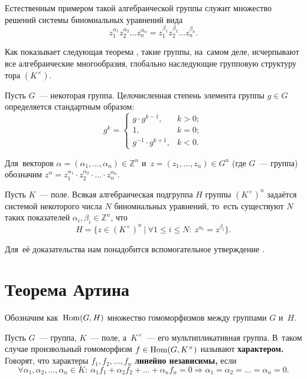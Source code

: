 \documentclass[a4paper,oneside]{article}
\begin{document}
Естественным примером такой алгебраической группы служит множество решений системы биномиальных уравнений вида
$$
    z_1^{\alpha_1} z_2^{\alpha_2} \ldots z_n^{\alpha_n} = z_1^{\beta_1} z_2^{\beta_2} \ldots z_n^{\beta_n}.
$$

Как показывает следующая теорема \cite{Schm94}, такие группы, на~самом деле, исчерпывают все алгебраические многообразия,
глобально наследующие групповую структуру тора $(K^\times)$.

Пусть $G$~— некоторая группа. Целочисленная степень элемента группы $g \in G$ определяется стандартным образом:
$$
  g^k =
  \begin{cases}
    g \cdot g^{k - 1}, & k > 0; \\
    1, & k = 0; \\
    g^{-1} \cdot g^{k + 1}, & k < 0.
  \end{cases}
$$

Для~векторов $\alpha = (\alpha_1, \ldots, \alpha_n) \in \mathbb{Z}^n$ и~$z = (z_1, \ldots, z_n) \in G^n$ (где $G$~— группа)
обозначим $z^\alpha = z_1^{\alpha_1} \cdot z_2^{\alpha_2} \cdot \ldots \cdot z_n^{\alpha_n}$.

\begin{theorem*}[Шмидт]
    Пусть $K$~— поле. Всякая алгебраическая подгруппа $H$ группы $(K^{\times})^n$ задаётся
    системой некоторого числа $N$ биномиальных уравнений, то~есть существуют $N$ таких показателей $\alpha_i, \beta_i \in \mathbb{Z}^n$, что
    $$
        H = \{ z \in (K^{\times})^n\ |\ \forall 1 \leq i \leq N{:}\ z^{\alpha_i} = z^{\beta_i} \}.
    $$
\end{theorem*}

Для~её доказательства нам понадобится вспомогательное утверждение \cite{Art48}.

\section{Теорема Артина}

Обозначим как~$\mathrm{Hom}(G, H)$ множество гомоморфизмов между группами $G$ и~$H$.

Пусть $G$~— группа, $K$~— поле, а~$K^{\times}$~— его мультипликативная группа.
В~таком случае произвольный гомоморфизм $f \in \mathrm{Hom}(G, K^{\times})$ называют \textbf{характером.}
Говорят, что характеры $f_1, f_2, \ldots, f_n$ \textbf{линейно независимы,}
если
$$
    \forall \alpha_1, \alpha_2, \ldots, \alpha_n \in K{:}\ \alpha_1 f_1 + \alpha_2 f_2 + \ldots + \alpha_n f_n = 0 \Rightarrow \alpha_1 = \alpha_2 = \ldots = \alpha_n = 0.
$$
\end{document}
